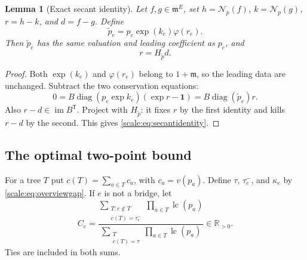 \documentclass[11pt,a4paper]{article}
\numberwithin{equation}{section}
\newtheorem{lemma}[theorem]{Lemma}
\theoremstyle{definition}
\newcommand{\R}{\mathbb R}
\newcommand{\mm}{\mathfrak m}
\newcommand{\NN}{\mathcal N}
\newcommand{\im}{\operatorname{im}}
\newcommand{\diag}{\operatorname{diag}}
\newcommand{\lc}{\operatorname{lc}}
\newcommand{\ph}{\varphi}
\begin{document}
\begin{lemma}[Exact secant identity]\label{scale:lem:secant}
Let $f,g\in\mm^E$, set
$h=\NN_p(f)$, $k=\NN_p(g)$, $r=h-k$, and $d=f-g$.
Define
\begin{equation}\label{scale:eq:secantweights}
 \widetilde p_e=p_e\exp(k_e)\ph(r_e).
\end{equation}
Then $\widetilde p_e$ has the same valuation and leading coefficient
as $p_e$, and
\begin{equation}\label{scale:eq:secantidentity}
 r=H_{\widetilde p}d.
\end{equation}
\end{lemma}
\begin{proof}
Both $\exp(k_e)$ and $\ph(r_e)$ belong to $1+\mm$, so the leading
data are unchanged. Subtract the two conservation equations:
\[
 0=B\diag(p_e\exp k_e)(\exp r-\mathbf1)
   =B\diag(\widetilde p_e)r.
\]
Also $r-d\in\im B^{\mathsf T}$. Project with
$H_{\widetilde p}$: it fixes $r$ by the first identity and kills
$r-d$ by the second. This gives \eqref{scale:eq:secantidentity}.
\end{proof}

\subsection{The optimal two-point bound}
For a tree $T$ put $c(T)=\sum_{a\in T}c_a$, with $c_a=v(p_a)$.
Define $\tau$, $\tau_e^-$, and $\kappa_e$ by
\eqref{scale:eq:overviewgap}. If $e$ is not a bridge, let
\begin{equation}\label{scale:eq:leadinggain}
 C_e=
 \frac{\displaystyle\sum_{\substack{T:e\notin T\\c(T)=\tau_e^-}}
                         \prod_{a\in T}\lc(p_a)}
      {\displaystyle\sum_{\substack{T\\c(T)=\tau}}
                         \prod_{a\in T}\lc(p_a)}\in\R_{>0}.
\end{equation}
Ties are included in both sums.
\end{document}
